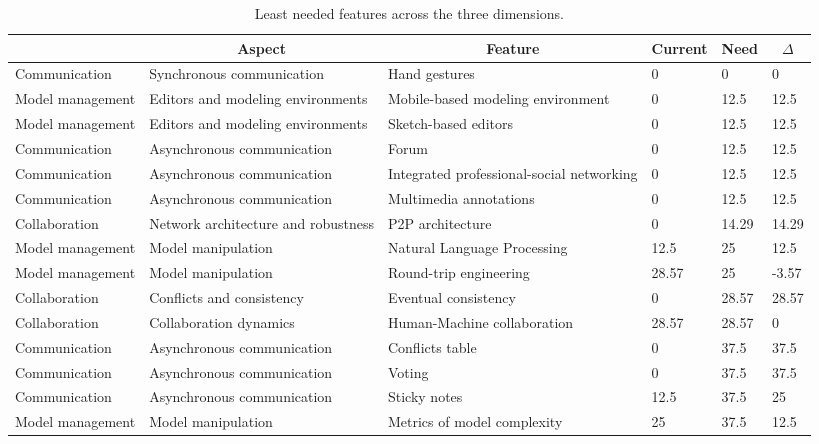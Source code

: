 
  \begin{table*}[]
  \centering
  \notsotiny
  \caption{ Least needed features across the three dimensions.}
\label{tab:least-needed}
\begin{tabular}{|l|l|l|l|l|l|}
  \hline
  \rowcolor[HTML]{C0C0C0}
    \multicolumn{1}{|c|}{Dimension} & \multicolumn{1}{c|}{Aspect} & \multicolumn{1}{c|}{Feature} & \multicolumn{1}{c|}{Current} & \multicolumn{1}{c|}{Need} & \multicolumn{1}{c|}{$\Delta$} \\ \hline
    Communication & Synchronous communication & Hand gestures & 0 & 0 & 0 \\ \hline 
Model management & Editors and modeling environments & Mobile-based modeling environment & 0 & 12.5 & 12.5 \\ \hline 
Model management & Editors and modeling environments & Sketch-based editors & 0 & 12.5 & 12.5 \\ \hline 
Communication & Asynchronous communication & Forum & 0 & 12.5 & 12.5 \\ \hline 
Communication & Asynchronous communication & Integrated professional-social networking & 0 & 12.5 & 12.5 \\ \hline 
Communication & Asynchronous communication & Multimedia annotations & 0 & 12.5 & 12.5 \\ \hline 
Collaboration & Network architecture and robustness & P2P architecture & 0 & 14.29 & 14.29 \\ \hline 
Model management & Model manipulation & Natural Language Processing & 12.5 & 25 & 12.5 \\ \hline 
Model management & Model manipulation & Round-trip engineering & 28.57 & 25 & -3.57 \\ \hline 
Collaboration & Conflicts and consistency & Eventual consistency & 0 & 28.57 & 28.57 \\ \hline 
Collaboration & Collaboration dynamics & Human-Machine collaboration & 28.57 & 28.57 & 0 \\ \hline 
Communication & Asynchronous communication & Conflicts table & 0 & 37.5 & 37.5 \\ \hline 
Communication & Asynchronous communication & Voting & 0 & 37.5 & 37.5 \\ \hline 
Communication & Asynchronous communication & Sticky notes & 12.5 & 37.5 & 25 \\ \hline 
Model management & Model manipulation & Metrics of model complexity & 25 & 37.5 & 12.5 \\ \hline 

\end{tabular}
\end{table*}
